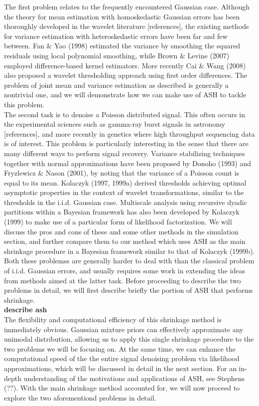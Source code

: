 \documentclass[12pt]{article}
\begin{document}
The first problem relates to the frequently encountered Gaussian case. Although the theory for mean estimation with homoskedastic Gaussian errors has been thoroughly developed in the wavelet literature [references], the existing methods for variance estimation with heteroskedastic errors have been far and few between. Fan \& Yao (1998) estimated the variance by smoothing the squared residuals using local polynomial smoothing, while Brown \& Levine (2007) employed difference-based kernel estimators. More recently Cai \& Wang (2008) also proposed a wavelet thresholding approach using first order differences. The problem of joint mean and variance estimation as described is generally a nontrivial one, and we will demonstrate how we can make use of ASH to tackle this problem.\bigskip\\
The second task is to denoise a Poisson distributed signal. This often occurs in the experimental sciences such as gamma-ray burst signals in astronomy [references], and more recently in genetics where high throughput sequencing data is of interest. This problem is particularly interesting in the sense that there are many different ways to perform signal recovery. Variance stabilizing techniques together with normal approximations have been proposed by Donoho (1993) and Fryzlewicz \& Nason (2001), by noting that the variance of a Poisson count is equal to its mean. Kolaczyk (1997, 1999a) derived thresholds achieving optimal asymptotic properties in the context of wavelet transformations, similar to the thresholds in the i.i.d. Gaussian case. Multiscale analysis using recursive dyadic partitions within a Bayesian framework has also been developed by Kolaczyk (1999) to make use of a particular form of likelihood factorization. We will discuss the pros and cons of these and some other methods in the simulation section, and further compare them to our method which uses ASH as the main shrinkage procedure in a Bayesian framework similar to that of Kolaczyk (1999b). \bigskip\\
Both these problemss are generally harder to deal with than the classical problem of i.i.d. Gaussian errors, and usually requires some work in extending the ideas from methods aimed at the latter task. Before proceeding to describe the two problems in detail, we will first describe briefly the portion of ASH that performs shrinkage. \bigskip\\
\textbf{describe ash}\bigskip\\
The flexibility and computational efficiency of this shrinkage method is immediately obvious. Gaussian mixture priors can effectively approximate any unimodal distribution, allowing us to apply this single shrinkage procedure to the two problems we will be focusing on. At the same time, we can enhance the computational speed of the the entire signal denoising problem via likelihood approximations, which will be discussed in detail in the next section. For an in-depth understanding of the motivations and applications of ASH, see Stephens (??). With the main shrinkage method accounted for, we will now proceed to explore the two aforementiond problems in detail.
\end{document}
